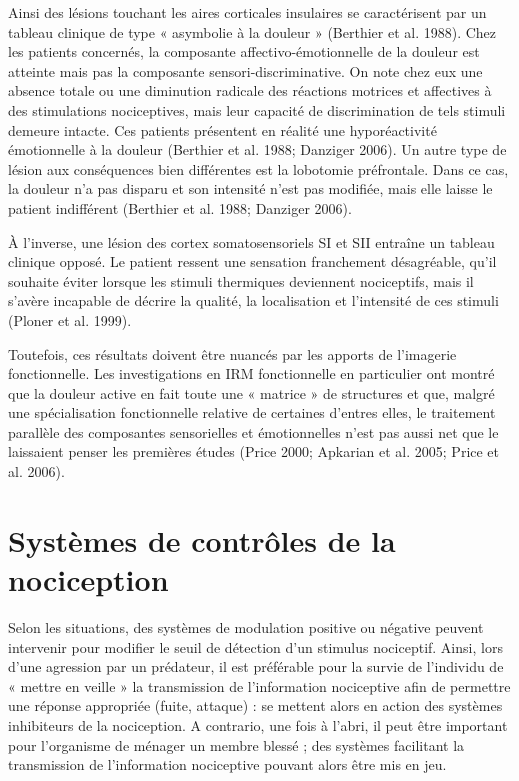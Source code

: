 \documentclass[a4paper,12pt,twoside]{report}
\begin{document}
\begin{description}
\item Ainsi des lésions touchant les aires corticales insulaires se caractérisent par un tableau clinique de type « asymbolie à la douleur » (Berthier et al. 1988). Chez les patients concernés, la composante affectivo-émotionnelle de la douleur est atteinte mais pas la composante sensori-discriminative. On note chez eux une absence totale ou une diminution radicale des réactions motrices et affectives à des stimulations nociceptives, mais leur capacité de discrimination de tels stimuli demeure intacte. Ces patients présentent en réalité une hyporéactivité émotionnelle à la douleur (Berthier et al. 1988; Danziger 2006). Un autre type de lésion aux conséquences bien différentes est la lobotomie préfrontale. Dans ce cas, la douleur n'a pas disparu et son intensité n'est pas modifiée, mais elle laisse le patient indifférent (Berthier et al. 1988; Danziger 2006).

\item \`A l’inverse, une lésion des cortex somatosensoriels SI et SII entraîne un tableau clinique opposé. Le patient ressent une sensation franchement désagréable, qu’il souhaite éviter lorsque les stimuli thermiques deviennent nociceptifs, mais il s’avère incapable de décrire la qualité, la localisation et l’intensité de ces stimuli (Ploner et al. 1999). 
\end{description}


Toutefois, ces résultats doivent être nuancés par les apports de l’imagerie fonctionnelle. Les investigations en IRM fonctionnelle en particulier ont montré que la douleur active en fait toute une « matrice » de structures et que, malgré une spécialisation fonctionnelle relative de certaines d’entres elles, le traitement parallèle des composantes sensorielles et émotionnelles n’est pas aussi net que le laissaient penser les premières études (Price 2000; Apkarian et al. 2005; Price et al. 2006).

\cleardoublepage

\chapter{Systèmes de contrôles de la nociception}

Selon les situations, des systèmes de modulation positive ou négative peuvent intervenir pour modifier le seuil de détection d’un stimulus nociceptif. Ainsi, lors d’une agression par un prédateur, il est préférable pour la survie de l’individu de « mettre en veille » la transmission de l’information nociceptive afin de permettre une réponse appropriée (fuite, attaque) : se mettent alors en action des systèmes inhibiteurs de la nociception. A contrario, une fois à l’abri, il peut être important pour l’organisme de ménager un membre blessé ; des systèmes facilitant la transmission de l’information nociceptive pouvant alors être mis en jeu.
\end{document}
